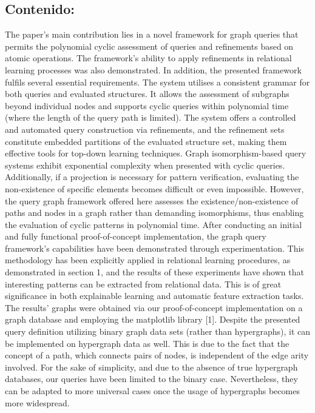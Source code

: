\documentclass{article}%
\begin{document}
\subsection{Contenido:}%
\label{subsec:Contenido}%
The paper's main contribution lies in a novel framework for graph queries that permits the polynomial cyclic assessment of queries and refinements based on atomic operations. The framework's ability to apply refinements in relational learning processes was also demonstrated. In addition, the presented framework fulfils several essential requirements. The system utilises a consistent grammar for both queries and evaluated structures. It allows the assessment of subgraphs beyond individual nodes and supports cyclic queries within polynomial time (where the length of the query path is limited). The system offers a controlled and automated query construction via refinements, and the refinement sets constitute embedded partitions of the evaluated structure set, making them effective tools for top{-}down learning techniques.\newline%
\newline%
Graph isomorphism{-}based query systems exhibit exponential complexity when presented with cyclic queries. Additionally, if a projection is necessary for pattern verification, evaluating the non{-}existence of specific elements becomes difficult or even impossible. However, the query graph framework offered here assesses the existence/non{-}existence of paths and nodes in a graph rather than demanding isomorphisms, thus enabling the evaluation of cyclic patterns in polynomial time.\newline%
\newline%
After conducting an initial and fully functional proof{-}of{-}concept implementation, the graph query framework's capabilities have been demonstrated through experimentation. This methodology has been explicitly applied in relational learning procedures, as demonstrated in section 1, and the results of these experiments have shown that interesting patterns can be extracted from relational data. This is of great significance in both explainable learning and automatic feature extraction tasks. The results' graphs were obtained via our proof{-}of{-}concept implementation on a graph database and employing the matplotlib library {[}1{]}.\newline%
\newline%
Despite the presented query definition utilizing binary graph data sets (rather than hypergraphs), it can be implemented on hypergraph data as well. This is due to the fact that the concept of a path, which connects pairs of nodes, is independent of the edge arity involved. For the sake of simplicity, and due to the absence of true hypergraph databases, our queries have been limited to the binary case. Nevertheless, they can be adapted to more universal cases once the usage of hypergraphs becomes more widespread.\newline%
\end{document}
